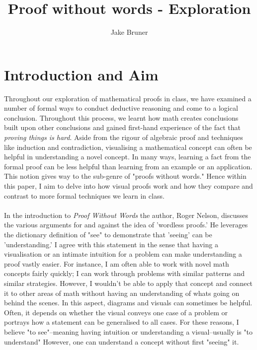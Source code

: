 \documentclass[11pt,a4paper]{article}
\author{Jake Bruner}
\title{Proof without words - Exploration}
\begin{document}
\maketitle
\tableofcontents
\pagebreak

\section{Introduction and Aim}

Throughout our exploration of mathematical proofs in class, we have examined a number of formal ways to conduct deductive reasoning and come to a logical conclusion. Throughout this process, we learnt how math creates conclusions built upon other conclusions and gained first-hand experience of the fact that \textit{proving things is hard}. Aside from the rigour of algebraic proof and techniques like induction and contradiction, visualising a mathematical concept can often be helpful in understanding a novel concept. In many ways, learning a fact from the formal proof can be less helpful than learning from an example or an application. This notion gives way to the sub-genre of "proofs without words." Hence within this paper, I aim to delve into how visual proofs work and how they compare and contrast to more formal techniques we learn in class. \\ \\


In the introduction to \textit{Proof Without Words} the author, Roger Nelson, discusses the various arguments for and against the idea of 'wordless proofs.' He leverages the dictionary definition of "see" to demonstrate that 'seeing' can be 'understanding.' I agree with this statement in the sense that having a visualisation or an intimate intuition for a problem can make understanding a proof vastly easier. For instance, I am often able to work with novel math concepts fairly quickly; I can work through problems with similar patterns and similar strategies. However, I wouldn't be able to apply that concept and connect it to other areas of math without having an understanding of whats going on behind the scenes. In this aspect, diagrams and visuals can sometimes be helpful. Often, it depends on whether the visual conveys one case of a problem or portrays how a statement can be generalised to all cases. For these reasons, I believe "to see"--meaning having intuition or understanding a visual--usually is "to understand" However, one can understand a concept without first "seeing" it. 

\pagebreak
\end{document}
